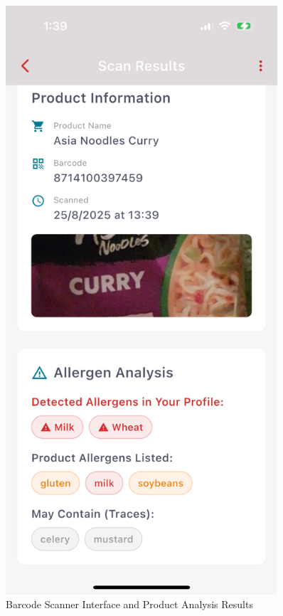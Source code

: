 \documentclass[MScCS]{uccthesis}
\begin{document}
\begin{figure}[htbp]
\begin{minipage}[b]{0.3\textwidth}
        \centering
        \includegraphics[width=0.9\textwidth,height=0.4\textheight,keepaspectratio]{Figures/barcode_scanner_result2.png}
    \end{minipage}
    \caption{Barcode Scanner Interface and Product Analysis Results}
    \label{fig:barcode-scanner-screenshots}
\end{figure}
\end{document}
